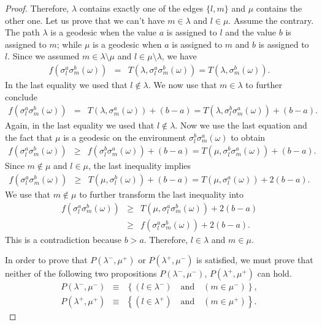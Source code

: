 \documentclass[reqno]{amsart}
\begin{document}
\begin{proof}
Therefore, $\lambda$ contains exactly one of the edges $\{l,m\}$ and $\mu$ contains the other one.  Let us prove that we can't have $m\in\lambda$ and $l\in\mu$. Assume the contrary. The path $\lambda$ is a geodesic when the value $a$ is assigned to $l$ and the value $b$ is assigned to $m$; while $\mu$ is a geodesic when $a$ is assigned to $m$ and $b$ is assigned to $l$. Since we assumed $m\in\lambda\setminus \mu$ and $l\in\mu\setminus \lambda$, we have 
\begin{eqnarray*} f(\sigma_l^a\sigma_m^b(\omega))&=& T(\lambda, \sigma_l^a\sigma_m^b(\omega))=T(\lambda,  \sigma_m^b(\omega)).\end{eqnarray*}
In the last equality we used that $l\not\in \lambda$. We now use that $m\in \lambda$ to further conclude \begin{eqnarray*}
f(\sigma_l^a\sigma_m^b(\omega))&=& T(\lambda,  \sigma_m^a(\omega))+(b-a)=T(\lambda, \sigma_l^b \sigma_m^a(\omega))+(b-a).
\end{eqnarray*}
Again, in the last equality we used that $l\not\in \lambda$. Now we use the last equation and the fact that $\mu$ is a geodesic on the environment 
$\sigma_l^b\sigma_m^a(\omega)$ to obtain
\begin{eqnarray*}
f(\sigma_l^a\sigma_m^b(\omega))
&\geq& f( \sigma_l^b \sigma_m^a(\omega))+(b-a)=T(\mu,\sigma_l^b \sigma_m^a(\omega))+(b-a).
\end{eqnarray*}
Since $m\not\in \mu$ and $l\in \mu$, the last inequality implies 
\begin{eqnarray*}
f(\sigma_l^a\sigma_m^b(\omega))
&\geq&T(\mu,\sigma_l^b (\omega))+(b-a) =T(\mu,\sigma_l^a (\omega))+2(b-a).\end{eqnarray*}
We use that $m\not \in \mu$ to further transform the last inequality into 
\begin{eqnarray*}
f(\sigma_l^a\sigma_m^b(\omega))
&\geq&T(\mu,\sigma_l^a\sigma_m^b (\omega))+2(b-a)\\
&\geq&f(\sigma_l^a\sigma_m^b(\omega))+2(b-a).
\end{eqnarray*}
This is a contradiction because $b>a$. 
Therefore, $l\in\lambda$ and $m\in\mu$.


In order to prove that $P(\lambda^-,\mu^+)$ or $P(\lambda^+,\mu^-)$ is satisfied, we must prove that neither of the following two propositions $P(\lambda^-,\mu^-)$, $P(\lambda^+,\mu^+)$ can hold.
\begin{eqnarray}
P(\lambda^-,\mu^-)&\equiv& \left\{(l\in \lambda^-) \quad\mbox{and}\quad (m\in\mu^-)\right\},\label{eqn|defLmMm}\\
P(\lambda^+,\mu^+)&\equiv&\left\{ (l\in \lambda^+) \quad\mbox{and}\quad (m\in\mu^+) \right\}.\label{eqn|defLpMp}
\end{eqnarray}



\end{proof}
\end{document}
